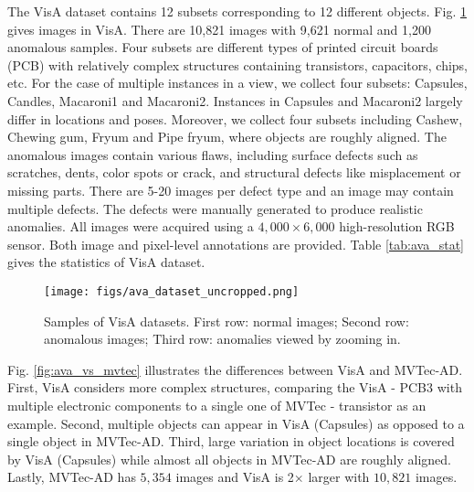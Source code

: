 The VisA dataset contains 12 subsets corresponding to 12 different objects. Fig. \ref{fig:ava_samples} gives images in VisA. There are 10,821 images with 9,621 normal and 1,200 anomalous samples. Four subsets are different types of printed circuit boards (PCB) with relatively complex structures containing transistors, capacitors, chips, etc. For the case of multiple instances in a view, we collect four subsets: Capsules, Candles, Macaroni1 and Macaroni2. Instances in Capsules and Macaroni2 largely differ in locations and poses. Moreover, we collect four subsets including Cashew, Chewing gum, Fryum and Pipe fryum, where objects are roughly aligned. The anomalous images contain various flaws, including surface defects such as scratches, dents, color spots or crack, and structural defects like misplacement or missing parts. There are 5-20 images per defect type and an image may contain multiple defects. The defects were manually generated to produce realistic anomalies. All images were acquired using a $4,000\times6,000$ high-resolution RGB sensor. Both image and pixel-level annotations are provided. Table \ref{tab:ava_stat} gives the statistics of VisA dataset. 
\begin{figure}[!t]
 \centering
\texttt{[image: figs/ava\_dataset\_uncropped.png]}
\caption{Samples of VisA datasets. First row: normal images; Second row: anomalous images; Third row: anomalies viewed by zooming in.}
\label{fig:ava_samples}
\end{figure}

Fig. \ref{fig:ava_vs_mvtec} illustrates the differences between VisA and MVTec-AD. First, VisA considers more complex structures, comparing the VisA - PCB3 with multiple electronic components to a single one of MVTec - transistor as an example. Second, multiple objects can appear in VisA (Capsules) as opposed to a single object in MVTec-AD. Third, large variation in object locations is covered by VisA (Capsules) while almost all objects in MVTec-AD are roughly aligned. Lastly, MVTec-AD has $5,354$ images and VisA is 2$\times$ larger with $10,821$ images.
